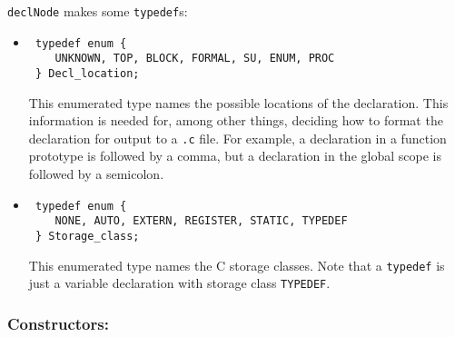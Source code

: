 \documentclass[10pt]{article}
\begin{document}
{\tt declNode} makes some {\tt typedef}s:

\begin{itemize}
\item

\begin{small}
\begin{verbatim}
 typedef enum {                                                                
    UNKNOWN, TOP, BLOCK, FORMAL, SU, ENUM, PROC                                 
 } Decl_location;
\end{verbatim}
\end{small}

This enumerated type names the possible locations of the declaration.  This
information is needed for, among other things, deciding how to format the
declaration for output to a {\tt .c} file.  For example, a declaration in a
function prototype is followed by a comma, but a declaration in the global
scope is followed by a semicolon.

\item

\begin{small}
\begin{verbatim}
 typedef enum {                                                                
    NONE, AUTO, EXTERN, REGISTER, STATIC, TYPEDEF                               
 } Storage_class;                                                              
\end{verbatim}
\end{small}

This enumerated type names the C storage classes.  Note that a {\tt typedef}
is just a variable declaration with storage class {\tt TYPEDEF}.

\end{itemize}

\subsubsection*{Constructors:}
\end{document}
